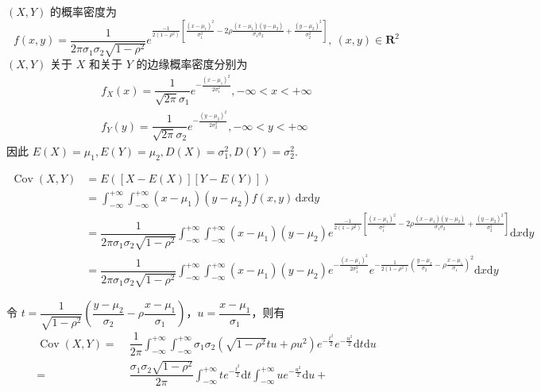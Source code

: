 \begin{myproof}
    $(X,Y)$ 的概率密度为
    $$
    f(x,y) = \dfrac{1}{2 \pi \sigma_1 \sigma_2 \sqrt{1-\rho^2}} e^{\frac{-1}{2(1-\rho^2)} \left[ \frac{(x-\mu_1)^2}{\sigma_1^2} - 2 \rho \frac{(x-\mu_1)(y-\mu_2)}{\sigma_1 \sigma_2} + \frac{(y-\mu_2)^2}{\sigma_2^2} \right]},\ (x,y)\in \mathbf{R}^2
    $$
    $(X,Y)$ 关于 $X$ 和关于 $Y$ 的边缘概率密度分别为
    \begin{gather*}
        f_{X}(x) = \dfrac{1}{\sqrt{2\pi} \sigma_1} e^{-\frac{(x-\mu_1)^2}{2 \sigma_1^2}}, -\infty < x < +\infty \\
        f_{Y}(y) = \dfrac{1}{\sqrt{2\pi} \sigma_2} e^{-\frac{(y-\mu_2)^2}{2 \sigma_2^2}}, -\infty < y < +\infty
    \end{gather*}
    因此 $E(X) = \mu_1, E(Y) = \mu_2, D(X) = \sigma_1^2, D(Y) = \sigma_2^2$.
    \begin{small}
    $$
    \begin{aligned}
        \operatorname{Cov}(X,Y) &= E([X-E(X)][Y-E(Y)]) \\
        &= \int_{-\infty}^{+\infty} \int_{-\infty}^{+\infty} (x-\mu_1)(y-\mu_2) f(x,y) \, \text{d}x \text{d}y \\
        &= \dfrac{1}{2 \pi \sigma_1 \sigma_2 \sqrt{1-\rho^2}} \int_{-\infty}^{+\infty} \int_{-\infty}^{+\infty} (x-\mu_1)(y-\mu_2) e^{\frac{-1}{2(1-\rho^2)} \left[ \frac{(x-\mu_1)^2}{\sigma_1^2} - 2 \rho \frac{(x-\mu_1)(y-\mu_2)}{\sigma_1 \sigma_2} + \frac{(y-\mu_2)^2}{\sigma_2^2} \right]} \text{d}x \text{d}y \\
        &= \dfrac{1}{2 \pi \sigma_1 \sigma_2 \sqrt{1-\rho^2}} \int_{-\infty}^{+\infty} \int_{-\infty}^{+\infty} (x-\mu_1)(y-\mu_2) e^{-\frac{(x-\mu_1)^2}{2 \sigma_1^2}} e^{-\frac{1}{2(1-\rho^2)} \left( \frac{y-\mu_2}{\sigma_2} - \rho \frac{x-\mu_1}{\sigma_1} \right)^2} \text{d}x \text{d}y
    \end{aligned}
    $$
    \end{small}
    令 $t = \dfrac{1}{\sqrt{1-\rho^2}} \left( \dfrac{y-\mu_2}{\sigma_2} - \rho \dfrac{x-\mu_1}{\sigma_1} \right)$，$u = \dfrac{x-\mu_1}{\sigma_1}$，则有
    $$
    \begin{aligned}
        \operatorname{Cov}(X,Y) = & \; \dfrac{1}{2 \pi} \int_{-\infty}^{+\infty} \int_{-\infty}^{+\infty} \sigma_1 \sigma_2 (\sqrt{1-\rho^2} tu + \rho u^2) e^{-\frac{t^2}{2}} e^{-\frac{u^2}{2}} \text{d}t \text{d}u \\
        = & \; \dfrac{\sigma_1 \sigma_2 \sqrt{1-\rho^2}}{2 \pi} \int_{-\infty}^{+\infty} t e^{-\frac{t^2}{2}} \text{d}t \int_{-\infty}^{+\infty} u e^{-\frac{u^2}{2}} \text{d}u + \\

\end{aligned}$$
\end{myproof}
